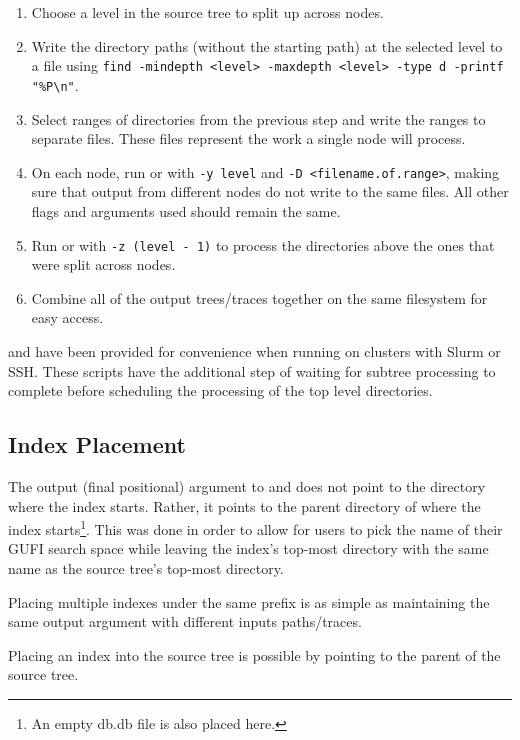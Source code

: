 \begin{enumerate}
\item Choose a level in the source tree to split up across nodes.
\item Write the directory paths (without the starting path) at the
  selected level to a file using \texttt{find -mindepth <level>
    -maxdepth <level> -type d -printf "\%P\textbackslash n"}.
\item Select ranges of directories from the previous step and write
  the ranges to separate files. These files represent the work a
  single node will process.
\item On each node, run \gufidirindex or \gufidirtrace with \texttt{-y
  level} and \texttt{-D <filename.of.range>}, making sure that output
  from different nodes do not write to the same files. All other flags
  and arguments used should remain the same.
\item Run \gufidirindex or \gufidirtrace with \texttt{-z (level - 1)}
  to process the directories above the ones that were split across
  nodes.
\item Combine all of the output trees/traces together on the same
  filesystem for easy access.
\end{enumerate}

\gufidirindexdistributed and \gufidirtracedistributed have been
provided for convenience when running on clusters with Slurm or
SSH. These scripts have the additional step of waiting for subtree
processing to complete before scheduling the processing of the top
level directories.

\subsection{Index Placement}
The output (final positional) argument to \gufidirindex and
\gufitraceindex does not point to the directory where the index
starts. Rather, it points to the parent directory of where the index
starts\footnote{An empty db.db file is also placed here.}. This was
done in order to allow for users to pick the name of their GUFI search
space while leaving the index's top-most directory with the same name
as the source tree's top-most directory.

Placing multiple indexes under the same prefix is as simple as
maintaining the same output argument with different inputs
paths/traces.

Placing an index into the source tree is possible by pointing
\gufidirindex to the parent of the source tree.

